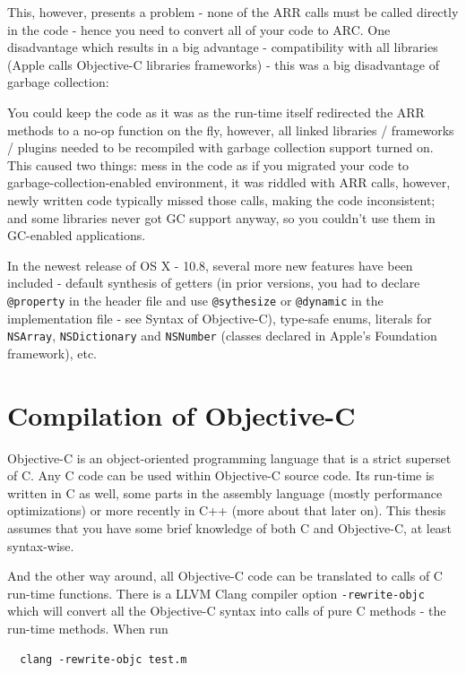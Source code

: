 This, however, presents a problem - none of the ARR calls must be called directly in the code - hence you need to convert all of your code to ARC\@. One disadvantage which results in a big advantage - compatibility with all libraries (Apple calls Objective-C libraries frameworks) - this was a big disadvantage of garbage collection: 

You could keep the code as it was as the run-time itself redirected the ARR methods to a no-op function on the fly, however, all linked libraries / frameworks / plugins needed to be recompiled with garbage collection support turned on. This caused two things: mess in the code as if you migrated your code to garbage-collection-enabled environment, it was riddled with ARR calls, however, newly written code typically missed those calls, making the code inconsistent; and some libraries never got GC support anyway, so you couldn't use them in GC-enabled applications.

In the newest release of OS X - 10.8, several more new features have been included - default synthesis of getters (in prior versions, you had to declare \verb=@property= in the header file and use \verb=@sythesize= or \verb=@dynamic= in the implementation file - see Syntax of Objective-C), type-safe enums, literals for \verb=NSArray=, \verb=NSDictionary= and \verb=NSNumber= (classes declared in Apple's Foundation framework), etc.

\section{Compilation of Objective-C}

Objective-C is an object-oriented programming language that is a strict superset of C. Any C code can be used within Objective-C source code. Its run-time is written in C as well, some parts in the assembly language (mostly performance optimizations) or more recently in C++ (more about that later on). This thesis assumes that you have some brief knowledge of both C and Objective-C, at least syntax-wise.

And the other way around, all Objective-C code can be translated to calls of C run-time functions. There is a LLVM Clang compiler option \verb=-rewrite-objc= which will convert all the Objective-C syntax into calls of pure C methods - the run-time methods. When run 

\begin{verbatim}
  clang -rewrite-objc test.m
\end{verbatim}

